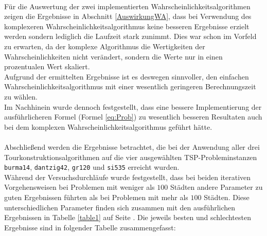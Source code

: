 \documentclass[doktyp=barbeit, sprache=german]{TUBAFarbeiten}
\begin{document}
\\Für die Auswertung der zwei implementierten Wahrscheinlichkeitsalgorithmen zeigen die Ergebnisse in Abschnitt \ref{AuswirkungWA}, dass bei Verwendung des komplexeren Wahrscheinlichkeitsalgorithmus keine besseren Ergebnisse erzielt werden sondern lediglich die Laufzeit stark zunimmt. Dies war schon im Vorfeld zu erwarten, da der komplexe Algorithmus die Wertigkeiten der Wahrscheinlichkeiten nicht verändert, sondern die Werte nur in einen prozentualen Wert skaliert.
\\Aufgrund der ermittelten Ergebnisse ist es deswegen sinnvoller, den einfachen Wahrscheinlichkeitsalgorithmus mit einer wesentlich geringeren Berechnungszeit zu wählen.
\\Im Nachhinein wurde dennoch festgestellt, dass eine bessere Implementierung der ausführlicheren Formel (Formel \ref{eq:Prob}) zu wesentlich besseren Resultaten auch bei dem komplexen Wahrscheinlichkeitsalgorithmus geführt hätte.
\\\\Abschließend werden die Ergebnisse betrachtet, die bei der Anwendung aller drei Tourkonstruktionsalgorithmen auf die vier ausgewählten TSP-Probleminstanzen \texttt{burma14}, \texttt{dantzig42}, \texttt{gr120} und \texttt{si535} erreicht wurden. 
\\Während der Versuchsdurchläufe wurde festgestellt, dass bei beiden iterativen Vorgehensweisen bei Problemen mit weniger als $100$ Städten andere Parameter zu guten Ergebnissen führten als bei Problemen mit mehr als $100$ Städten. Diese unterschiedlichen Parameter finden sich zusammen mit den ausführlichen Ergebnissen in Tabelle \ref{table1} auf Seite \pageref{table1}. Die jeweils besten und schlechtesten Ergebnisse sind in folgender Tabelle zusammengefasst:
\end{document}

